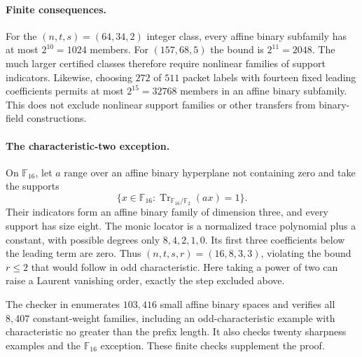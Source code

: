 \documentclass[11pt,letterpaper]{article}
\theoremstyle{definition}
\theoremstyle{remark}
\begin{document}
\paragraph{Finite consequences.}
For the $(n,t,s)=(64,34,2)$ integer class, every affine binary
subfamily has at most $2^{10}=1024$ members. For $(157,68,5)$ the
bound is $2^{11}=2048$. The much larger certified classes therefore
require nonlinear families of support indicators. Likewise, choosing
$272$ of $511$ packet labels with fourteen fixed leading coefficients
permits at most $2^{15}=32768$ members in an affine binary subfamily.
This does not exclude nonlinear support families or other transfers
from binary-field constructions.

\paragraph{The characteristic-two exception.}
On $\mathbb F_{16}$, let $a$ range over an affine binary hyperplane
not containing zero and take the supports
\[
 \{x\in\mathbb F_{16}:\operatorname{Tr}_{\mathbb F_{16}/\mathbb F_2}(ax)=1\}.
\]
Their indicators form an affine binary family of dimension three,
and every support has size eight. The monic locator is a normalized
trace polynomial plus a constant, with possible degrees only
$8,4,2,1,0$. Its first three coefficients below the leading term
are zero. Thus $(n,t,s,r)=(16,8,3,3)$, violating the bound $r\le2$
that would follow in odd characteristic. Here taking a power of two
can raise a Laurent vanishing order, exactly the step excluded above.

The checker in  enumerates
$103{,}416$ small affine binary spaces and verifies all $8{,}407$
constant-weight families, including an odd-characteristic example
with characteristic no greater than the prefix length. It also checks
twenty sharpness examples and the $\mathbb F_{16}$ exception.
These finite checks supplement the proof.
\end{document}
